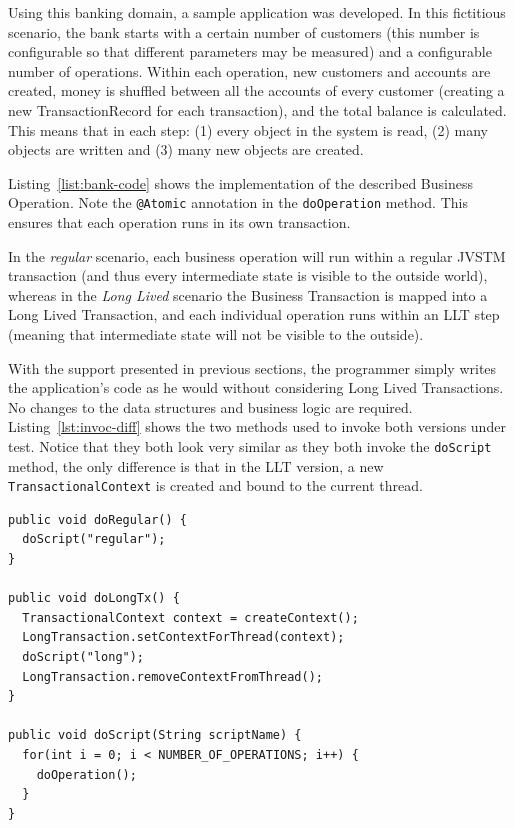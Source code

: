 Using this banking domain, a sample application was developed. In this
fictitious scenario, the bank starts with a certain number of
customers (this number is configurable so that different parameters
may be measured) and a configurable number of operations. Within each
operation, new customers and accounts are created, money is shuffled
between all the accounts of every customer (creating a new
TransactionRecord for each transaction), and the total balance is
calculated. This means that in each step: (1) every object in the
system is read, (2) many objects are written and (3) many new objects
are created.

Listing~\ref{list:bank-code} shows the implementation of the described
Business Operation. Note the \texttt{@Atomic} annotation in the
\texttt{doOperation} method. This ensures that each operation runs in
its own transaction.

In the {\it regular} scenario, each business operation will run within
a regular JVSTM transaction (and thus every intermediate state is
visible to the outside world), whereas in the {\it Long Lived}
scenario the Business Transaction is mapped into a Long Lived
Transaction, and each individual operation runs within an LLT step
(meaning that intermediate state will not be visible to the outside).

With the support presented in previous sections, the programmer simply
writes the application's code as he would without considering Long
Lived Transactions. No changes to the data structures and business
logic are required. Listing~\ref{lst:invoc-diff} shows the two methods
used to invoke both versions under test. Notice that they both look
very similar as they both invoke the \texttt{doScript} method, the
only difference is that in the LLT version, a new
\texttt{TransactionalContext} is created and bound to the current
thread.

\begin{lstlisting}[caption={Invoking the business operation},
 label={lst:invoc-diff},float]
public void doRegular() {
  doScript("regular");
}

public void doLongTx() {
  TransactionalContext context = createContext();
  LongTransaction.setContextForThread(context);
  doScript("long");
  LongTransaction.removeContextFromThread();
}

public void doScript(String scriptName) {
  for(int i = 0; i < NUMBER_OF_OPERATIONS; i++) {
    doOperation();
  }
}
\end{lstlisting}

